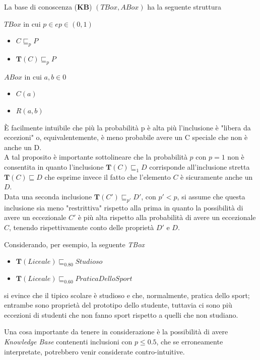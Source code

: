 La base di conoscenza (\textbf{KB}) $ (TBox,ABox) $ ha la seguente struttura
\begin{multicols}{2}
	$ TBox $ in cui $ p \in \mathbb{} e p \in (0,1) $
	\begin{itemize}
		\item $ C \sqsubseteq_{p} P $
		\item $ \mathbf{T}(C) \sqsubseteq_{p} P $
	\end{itemize} 
	$ ABox $ in cui $ a,b \in \mathcal{0} $
	\begin{itemize}
		\item $ C(a) $
		\item $ R(a,b) $
	\end{itemize}
\end{multicols}

È facilmente intuibile che più la probabilità p è alta più l’inclusione è "libera da eccezioni" o, 
equivalentemente, è meno probabile avere un C speciale che non è anche un D.\\
A tal proposito è importante sottolineare che la probabilità $ p $  con $ p = 1 $ non è consentita 
in quanto l’inclusione $ \mathbf{T}(C) \sqsubseteq_{1} D  $
corrisponde all'inclusione stretta $ \mathbf{T}(C) \sqsubseteq D $ che esprime invece il fatto che
l’elemento $ C $ è sicuramente anche un $ D $.\\
Data una seconda inclusione $ \mathbf{T}(C') \sqsubseteq_{p'} D' $, con $ p' < p $, si assume che questa
inclusione sia meno "restrittiva" rispetto alla prima in quanto la possibilità di avere un
eccezionale $ C' $ è più alta rispetto alla probabilità di avere un eccezionale $ C $, tenendo rispettivamente
conto delle proprietà $ D' \text{ e } D $.

Considerando, per esempio, la seguente \textit{TBox}
\begin{itemize}
	\item $ \mathbf{T}(Liceale) \sqsubseteq_{0.80} Studioso $
	\item $ \mathbf{T}(Liceale) \sqsubseteq_{0.60} PraticaDelloSport $
\end{itemize}
si evince che il tipico scolare è studioso e che, normalmente, pratica dello sport;
entrambe sono proprietà del prototipo dello studente, tuttavia ci sono più
eccezioni di studenti che non fanno sport rispetto a quelli che non studiano.

Una cosa importante da tenere in considerazione è la possibilità di avere \textit{Knowledge Base}
contenenti inclusioni con $ p \leq 0.5 $, che se
erroneamente interpretate, potrebbero venir considerate contro-intuitive.

